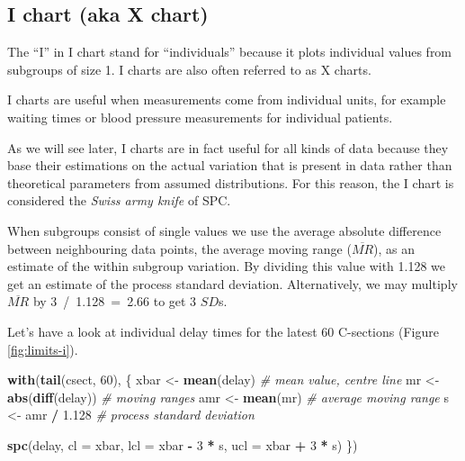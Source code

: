 \documentclass[
]{book}
\newenvironment{Shaded}{\begin{snugshade}}{\end{snugshade}}
\newcommand{\AttributeTok}[1]{\textcolor[rgb]{0.13,0.29,0.53}{#1}}
\newcommand{\CommentTok}[1]{\textcolor[rgb]{0.56,0.35,0.01}{\textit{#1}}}
\newcommand{\DecValTok}[1]{\textcolor[rgb]{0.00,0.00,0.81}{#1}}
\newcommand{\FloatTok}[1]{\textcolor[rgb]{0.00,0.00,0.81}{#1}}
\newcommand{\FunctionTok}[1]{\textcolor[rgb]{0.13,0.29,0.53}{\textbf{#1}}}
\newcommand{\NormalTok}[1]{#1}
\newcommand{\OtherTok}[1]{\textcolor[rgb]{0.56,0.35,0.01}{#1}}
\newcommand{\SpecialCharTok}[1]{\textcolor[rgb]{0.81,0.36,0.00}{\textbf{#1}}}
\begin{document}
\subsection{I chart (aka X chart)}\label{i-chart-aka-x-chart}

The ``I'' in I chart stand for ``individuals'' because it plots individual values from subgroups of size 1. I charts are also often referred to as X charts.

I charts are useful when measurements come from individual units, for example waiting times or blood pressure measurements for individual patients.

As we will see later, I charts are in fact useful for all kinds of data because they base their estimations on the actual variation that is present in data rather than theoretical parameters from assumed distributions. For this reason, the I chart is considered the \emph{Swiss army knife} of SPC.

When subgroups consist of single values we use the average absolute difference between neighbouring data points, the average moving range (\(\overline{MR}\)), as an estimate of the within subgroup variation. By dividing this value with 1.128 we get an estimate of the process standard deviation. Alternatively, we may multiply \(\overline{MR}\) by 3~/~1.128~=~2.66 to get 3 \(SD\)s.

Let's have a look at individual delay times for the latest 60 C-sections (Figure \ref{fig:limits-i}).

\begin{Shaded}
\begin{Highlighting}[]
\FunctionTok{with}\NormalTok{(}\FunctionTok{tail}\NormalTok{(csect, }\DecValTok{60}\NormalTok{), \{}
\NormalTok{  xbar }\OtherTok{\textless{}{-}} \FunctionTok{mean}\NormalTok{(delay)      }\CommentTok{\# mean value, centre line}
\NormalTok{  mr   }\OtherTok{\textless{}{-}} \FunctionTok{abs}\NormalTok{(}\FunctionTok{diff}\NormalTok{(delay)) }\CommentTok{\# moving ranges}
\NormalTok{  amr  }\OtherTok{\textless{}{-}} \FunctionTok{mean}\NormalTok{(mr)         }\CommentTok{\# average moving range}
\NormalTok{  s    }\OtherTok{\textless{}{-}}\NormalTok{ amr }\SpecialCharTok{/} \FloatTok{1.128}      \CommentTok{\# process standard deviation}
  
  \FunctionTok{spc}\NormalTok{(delay,}
      \AttributeTok{cl  =}\NormalTok{ xbar,}
      \AttributeTok{lcl =}\NormalTok{ xbar }\SpecialCharTok{{-}} \DecValTok{3} \SpecialCharTok{*}\NormalTok{ s,}
      \AttributeTok{ucl =}\NormalTok{ xbar }\SpecialCharTok{+} \DecValTok{3} \SpecialCharTok{*}\NormalTok{ s)}
\NormalTok{\})}
\end{Highlighting}
\end{Shaded}
\end{document}
